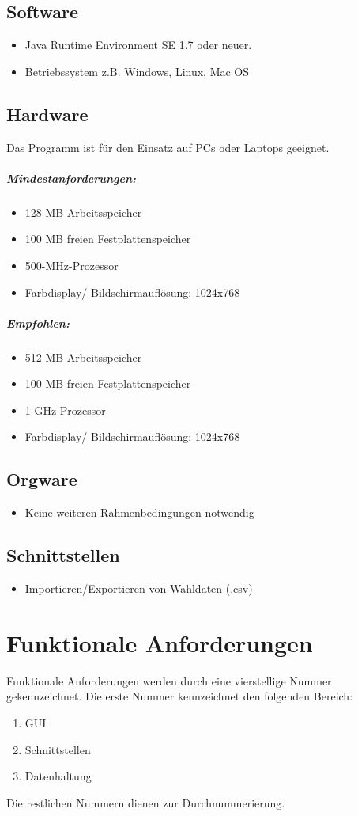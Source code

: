 \documentclass[10pt,a4paper]{article}
\begin{document}
\subsection{Software}
\begin{itemize}
\item Java Runtime Environment SE 1.7 oder neuer.
\item Betriebssystem z.B. Windows, Linux, Mac OS
\end{itemize}


\subsection{Hardware}
Das Programm ist für den Einsatz auf PCs oder Laptops geeignet.
\subparagraph{Mindestanforderungen:}
\begin{itemize}
\item 128 MB Arbeitsspeicher
\item 100 MB freien Festplattenspeicher
\item 500-MHz-Prozessor
\item Farbdisplay/ Bildschirmauflösung: 1024x768
\end{itemize}

\subparagraph{Empfohlen:}
\begin{itemize}
\item 512 MB Arbeitsspeicher
\item 100 MB freien Festplattenspeicher
\item 1-GHz-Prozessor
\item Farbdisplay/ Bildschirmauflösung: 1024x768
\end{itemize}


\subsection{Orgware}
\begin{itemize}
\item Keine weiteren Rahmenbedingungen notwendig
\end{itemize}


\subsection{Schnittstellen}
\begin{itemize}
\item Importieren/Exportieren von Wahldaten (.csv)
\end{itemize}


\section{Funktionale Anforderungen}
Funktionale Anforderungen werden durch eine vierstellige Nummer gekennzeichnet. Die erste Nummer kennzeichnet den folgenden Bereich:
\begin{enumerate}
	\item GUI
	\item Schnittstellen
	\item Datenhaltung
\end{enumerate}
Die restlichen Nummern dienen zur Durchnummerierung.
\end{document}
